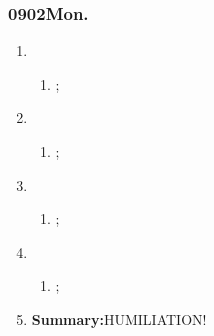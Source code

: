 \subsubsection{0902Mon.}
\begin{enumerate}
	\item \ncquaone
	\begin{enumerate}[(1)]
		\item ;\rightundoneBlack
	\end{enumerate}
	
	\item \ncquatwo	
	\begin{enumerate}[(1)]
		\item ;\rightundoneBlack
	\end{enumerate}
	
	\item \ncquathree
	\begin{enumerate}[(1)]
		\item ;\rightundoneBlack
	\end{enumerate}
	
	\item \ncquafour	
	\begin{enumerate}[(1)]
		\item ;\rightundoneBlack
	\end{enumerate}
	\item \textbf{Summary:}HUMILIATION! 
\end{enumerate}
